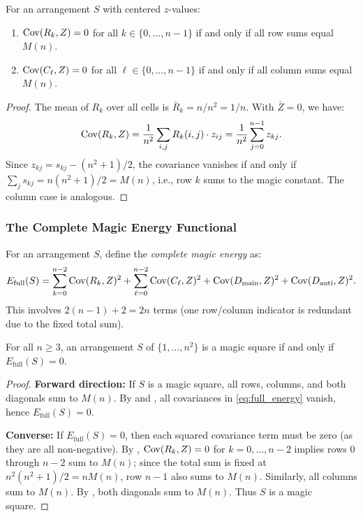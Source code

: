 \begin{proposition}
\label{prop:rowcol_cov}
For an arrangement $S$ with centered $z$-values:
\begin{enumerate}
\item $\mathrm{Cov}(R_k, Z) = 0$ for all $k \in \{0, \ldots, n-1\}$ if and only if all row sums equal $M(n)$.
\item $\mathrm{Cov}(C_\ell, Z) = 0$ for all $\ell \in \{0, \ldots, n-1\}$ if and only if all column sums equal $M(n)$.
\end{enumerate}
\end{proposition}

\begin{proof}
The mean of $R_k$ over all cells is $\bar{R}_k = n/n^2 = 1/n$.
With $\bar{Z} = 0$, we have:
\[
\mathrm{Cov}(R_k, Z) = \frac{1}{n^2} \sum_{i,j} R_k(i,j) \cdot z_{ij} = \frac{1}{n^2} \sum_{j=0}^{n-1} z_{kj}.
\]
Since $z_{kj} = s_{kj} - (n^2+1)/2$, the covariance vanishes if and only if 
$\sum_j s_{kj} = n(n^2+1)/2 = M(n)$, i.e., row $k$ sums to the magic constant.
The column case is analogous.
\end{proof}

\subsubsection{The Complete Magic Energy Functional}

\begin{definition}
\label{def:complete_energy}
For an arrangement $S$, define the \emph{complete magic energy} as:
\begin{equation}
E_{\mathrm{full}}(S) = \sum_{k=0}^{n-2} \mathrm{Cov}(R_k, Z)^2 + \sum_{\ell=0}^{n-2} \mathrm{Cov}(C_\ell, Z)^2 
+ \mathrm{Cov}(D_{\mathrm{main}}, Z)^2 + \mathrm{Cov}(D_{\mathrm{anti}}, Z)^2.
\label{eq:full_energy}
\end{equation}
This involves $2(n-1) + 2 = 2n$ terms (one row/column indicator is redundant due to the fixed total sum).
\end{definition}

\begin{theorem}
\label{thm:complete_energy_char}
For all $n \geq 3$, an arrangement $S$ of $\{1, \ldots, n^2\}$ is a magic square 
if and only if $E_{\mathrm{full}}(S) = 0$.
\end{theorem}

\begin{proof}
\textbf{Forward direction:} If $S$ is a magic square, all rows, columns, and both diagonals sum to $M(n)$.
By  and , all covariances in \eqref{eq:full_energy} vanish,
hence $E_{\mathrm{full}}(S) = 0$.

\textbf{Converse:} If $E_{\mathrm{full}}(S) = 0$, then each squared covariance term must be zero 
(as they are all non-negative). By , $\mathrm{Cov}(R_k, Z) = 0$ for $k = 0, \ldots, n-2$
implies rows $0$ through $n-2$ sum to $M(n)$; since the total sum is fixed at $n^2(n^2+1)/2 = nM(n)$,
row $n-1$ also sums to $M(n)$. Similarly, all columns sum to $M(n)$.
By , both diagonals sum to $M(n)$. Thus $S$ is a magic square.
\end{proof}

